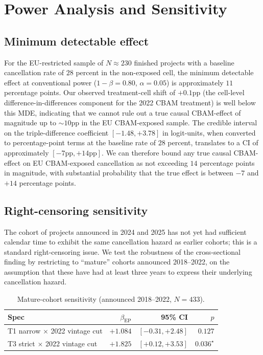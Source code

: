 \documentclass[11pt,a4paper]{article}
\newcommand{\bep}{\beta_{\mathrm{EP}}}
\begin{document}
\section{Power Analysis and Sensitivity}
\label{sec:ch8-power}

\subsection{Minimum detectable effect}

For the EU-restricted sample of $N \approx 230$ finished projects with a baseline cancellation rate of $28$ percent in the non-exposed cell, the minimum detectable effect at conventional power ($1 - \beta = 0.80$, $\alpha = 0.05$) is approximately $11$ percentage points. Our observed treatment-cell shift of $+0.1$pp (the cell-level difference-in-differences component for the 2022 CBAM treatment) is well below this MDE, indicating that we cannot rule out a true causal CBAM-effect of magnitude up to $\sim 10$pp in the EU CBAM-exposed sample. The credible interval on the triple-difference coefficient $[-1.48, +3.78]$ in logit-units, when converted to percentage-point terms at the baseline rate of $28$ percent, translates to a CI of approximately $[-7\text{pp}, +14\text{pp}]$. We can therefore bound any true causal CBAM-effect on EU CBAM-exposed cancellation as not exceeding $14$ percentage points in magnitude, with substantial probability that the true effect is between $-7$ and $+14$ percentage points.

\subsection{Right-censoring sensitivity}

The cohort of projects announced in 2024 and 2025 has not yet had sufficient calendar time to exhibit the same cancellation hazard as earlier cohorts; this is a standard right-censoring issue. We test the robustness of the cross-sectional finding by restricting to ``mature'' cohorts announced 2018--2022, on the assumption that these have had at least three years to express their underlying cancellation hazard.

\begin{table}[ht]
\centering
\caption{Mature-cohort sensitivity (announced 2018--2022, $N=433$).}
\label{tab:ch8-mature}
\begin{tabular}{lrrr}
\toprule
Spec & $\bep$ & 95\% CI & $p$ \\
\midrule
T1 narrow $\times$ 2022 vintage cut & $+1.084$ & $[-0.31, +2.48]$ & $0.127$ \\
T3 strict $\times$ 2022 vintage cut & $+1.825$ & $[+0.12, +3.53]$ & $0.036^{\star}$ \\
\bottomrule
\end{tabular}
\end{table}
\end{document}
